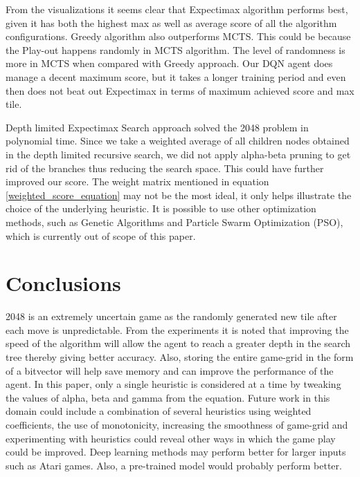 \documentclass{svproc}
\begin{document}
    From the visualizations it seems clear that Expectimax algorithm performs best, given it has both the highest max as well as average score of all the algorithm configurations. Greedy algorithm also outperforms MCTS. This could be because the Play-out happens randomly in MCTS algorithm. The level of randomness is more in MCTS when compared with Greedy approach. Our DQN agent does manage a decent maximum score, but it takes a longer training period and even then does not beat out Expectimax in terms of maximum achieved score and max tile.
    
    Depth limited Expectimax Search approach solved the 2048 problem in polynomial time. Since we take a weighted average of all children nodes obtained in the depth limited recursive search, we did not apply alpha-beta pruning \cite{7162574} to get rid of the branches thus reducing the search space. This could have further improved our score. The weight matrix mentioned in equation \ref{weighted_score_equation} may not be the most ideal, it only helps illustrate the choice of the underlying heuristic. It is possible to use other optimization methods, such as Genetic Algorithms and Particle Swarm Optimization (PSO), which is currently out of scope of this paper.
    

    \section{Conclusions}
    2048 is an extremely uncertain game as the randomly generated new tile after each move is unpredictable. From the experiments it is noted that improving the speed of the algorithm will allow the agent to reach a greater depth in the search tree thereby giving better accuracy. Also, storing the entire game-grid in the form of a bitvector will help save memory and can improve the performance of the agent. In this paper, only a single heuristic is considered at a time by tweaking the values of alpha, beta and gamma from the equation. Future work in this domain could include a combination of several heuristics using weighted coefficients, the use of monotonicity, increasing the smoothness of game-grid and experimenting with heuristics could reveal other ways in which the game play could be improved. Deep learning methods may perform better for larger inputs such as Atari games. Also, a pre-trained model would probably perform better.
    
\end{document}
